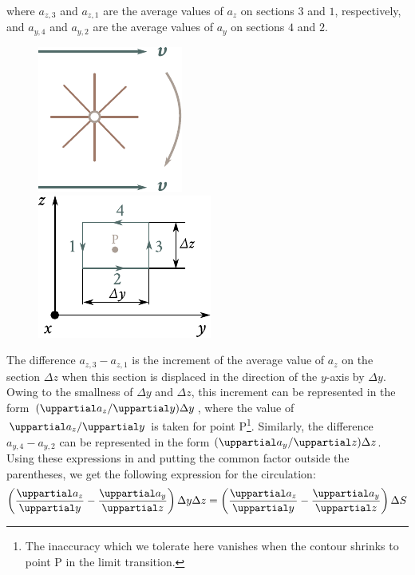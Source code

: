 \noindent
where $a_{z,3}$ and $a_{z,1}$ are the average values of $a_z$ on sections $3$ and $1$, respectively, and $a_{y,4}$ and $a_{y,2}$ are the average values of $a_{y}$ on sections $4$ and $2$.

\begin{figure}[t]
	\begin{minipage}[t]{0.5\linewidth}
		\begin{center}
			\includegraphics[scale=1]{figures/ch_01/fig_1_30.pdf}
			\caption[]{}
			\label{fig:1_30}
		\end{center}
	\end{minipage}
	\hspace{-0.1cm}
	\begin{minipage}[t]{0.5\linewidth}
		\begin{center}
			\includegraphics[scale=1]{figures/ch_01/fig_1_31.pdf}
			\caption[]{}
			\label{fig:1_31}
		\end{center}
	\end{minipage}
\vspace{-0.4cm}
\end{figure}

The difference $a_{z,3}-a_{z,1}$ is the increment of the average value of $a_z$ on the section $\Delta{z}$ when this section is displaced in the direction of the $y$-axis by $\Delta{y}$. Owing to the smallness of $\Delta{y}$ and $\Delta{z}$, this increment can be represented in the form $(\diffinpartial{a_z}{y})\Delta{y}$, where the value of $\diffinpartial{a_z}{y}$ is taken for point P\footnote{The inaccuracy which we tolerate here vanishes when the contour shrinks to point P in the limit transition.}. Similarly, the difference $a_{y,4}-a_{y,2}$ can be represented in the form $(\diffinpartial{a_y}{z})\Delta{z}$.
Using these expressions in  and putting the common factor outside the parentheses, we get the following expression for the circulation:
\begin{equation*}
	\parenthesis{\diffpartial{a_z}{y} - \diffpartial{a_y}{z}} \Delta{y}\Delta{z} = \parenthesis{\diffpartial{a_z}{y} - \diffpartial{a_y}{z}} \Delta{S}
\end{equation*}

